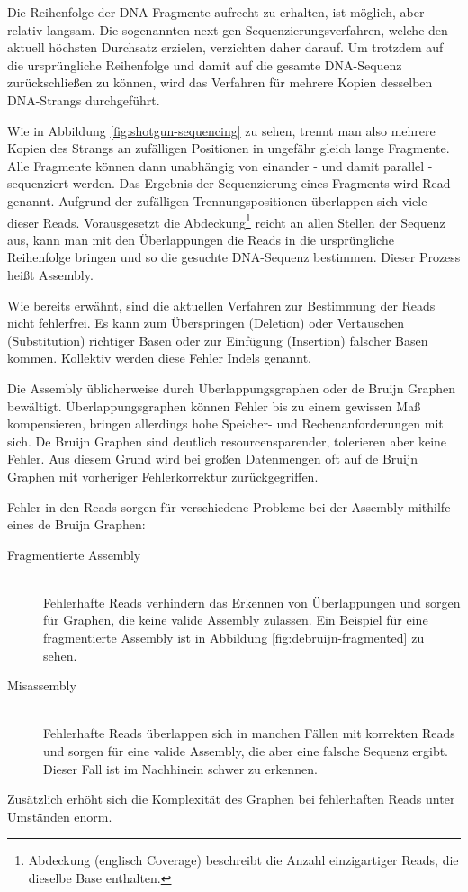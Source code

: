 Die Reihenfolge der DNA-Fragmente aufrecht zu erhalten, ist möglich, aber relativ langsam.
Die sogenannten next-gen Sequenzierungsverfahren, welche den aktuell höchsten Durchsatz erzielen, verzichten daher darauf.
Um trotzdem auf die ursprüngliche Reihenfolge und damit auf die gesamte DNA-Sequenz zurückschließen zu können, wird das Verfahren für mehrere Kopien desselben DNA-Strangs durchgeführt.

Wie in Abbildung \ref{fig:shotgun-sequencing} zu sehen, trennt man also mehrere Kopien des Strangs an zufälligen Positionen in ungefähr gleich lange Fragmente.
Alle Fragmente können dann unabhängig von einander - und damit parallel - sequenziert werden.
Das Ergebnis der Sequenzierung eines Fragments wird Read genannt.
Aufgrund der zufälligen Trennungspositionen überlappen sich viele dieser Reads.
Vorausgesetzt die Abdeckung\footnote{Abdeckung (englisch Coverage) beschreibt die Anzahl einzigartiger Reads, die dieselbe Base enthalten.}
reicht an allen Stellen der Sequenz aus, kann man mit den Überlappungen die Reads in die ursprüngliche Reihenfolge bringen und so die gesuchte DNA-Sequenz bestimmen.
Dieser Prozess heißt Assembly.

Wie bereits erwähnt, sind die aktuellen Verfahren zur Bestimmung der Reads nicht fehlerfrei.
Es kann zum Überspringen (Deletion) oder Vertauschen (Substitution) richtiger Basen oder zur Einfügung (Insertion) falscher Basen kommen.
Kollektiv werden diese Fehler Indels genannt.

Die Assembly üblicherweise durch Überlappungsgraphen oder de Bruijn Graphen bewältigt.
Überlappungsgraphen können Fehler bis zu einem gewissen Maß kompensieren, bringen allerdings hohe Speicher- und Rechenanforderungen mit sich.
De Bruijn Graphen sind deutlich resourcensparender, tolerieren aber keine Fehler.
Aus diesem Grund wird bei großen Datenmengen oft auf de Bruijn Graphen mit vorheriger Fehlerkorrektur zurückgegriffen.

Fehler in den Reads sorgen für verschiedene Probleme bei der Assembly mithilfe eines de Bruijn Graphen:
\begin{description}
	\item[Fragmentierte Assembly]\hfill \\
		Fehlerhafte Reads verhindern das Erkennen von Überlappungen und sorgen für Graphen, die keine valide Assembly zulassen. Ein Beispiel für eine fragmentierte Assembly ist in Abbildung \ref{fig:debruijn-fragmented} zu sehen.
	\item[Misassembly]\hfill \\
		Fehlerhafte Reads überlappen sich in manchen Fällen mit korrekten Reads und sorgen für eine valide Assembly, die aber eine falsche Sequenz ergibt. \\
		Dieser Fall ist im Nachhinein schwer zu erkennen.
\end{description}
Zusätzlich erhöht sich die Komplexität des Graphen bei fehlerhaften Reads unter Umständen enorm.


